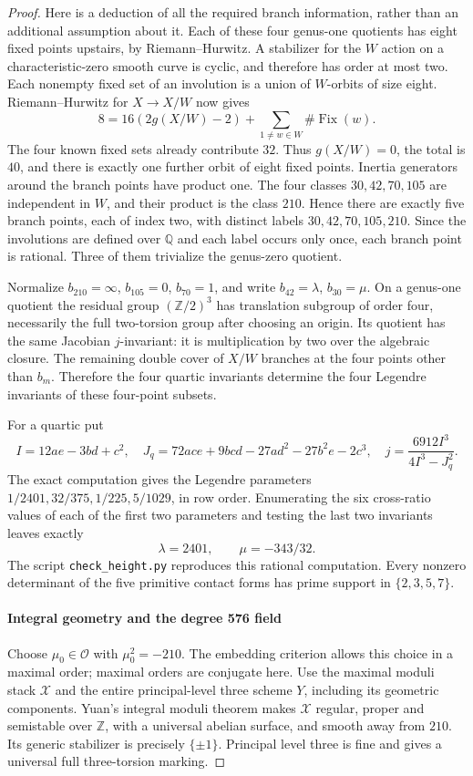 \begin{proof}
Here is a deduction of all the required branch information, rather than
an additional assumption about it. Each of these four genus-one quotients
has eight fixed points upstairs, by Riemann--Hurwitz. A stabilizer for the
$W$ action on a characteristic-zero smooth curve is cyclic, and therefore
has order at most two. Each nonempty fixed set of an involution is a union
of $W$-orbits of size eight. Riemann--Hurwitz for $X\to X/W$ now gives
\[
 8=16(2g(X/W)-2)+\sum_{1\ne w\in W}\#\operatorname{Fix}(w).
\]
The four known fixed sets already contribute $32$. Thus $g(X/W)=0$,
the total is $40$, and there is exactly one further orbit of eight fixed
points. Inertia generators around the branch points have product one.
The four classes $30,42,70,105$ are independent in $W$, and their product
is the class $210$. Hence there are exactly five branch points, each of
index two, with distinct labels $30,42,70,105,210$. Since the involutions
are defined over $\mathbb Q$ and each label occurs only once, each branch
point is rational. Three of them trivialize the genus-zero quotient.

Normalize $b_{210}=\infty$, $b_{105}=0$, $b_{70}=1$, and write
$b_{42}=\lambda$, $b_{30}=\mu$. On a genus-one quotient the residual
group $(\mathbb Z/2)^3$ has translation subgroup of order four, necessarily
the full two-torsion group after choosing an origin. Its quotient has the
same Jacobian $j$-invariant: it is multiplication by two over the algebraic
closure. The remaining double cover of $X/W$ branches at the four points
other than $b_m$. Therefore the four quartic invariants determine the four
Legendre invariants of these four-point subsets.

For a quartic put
\[
 I=12ae-3bd+c^2,\quad
 J_q=72ace+9bcd-27ad^2-27b^2e-2c^3,\quad
 j=\frac{6912I^3}{4I^3-J_q^2}.
\]
The exact computation gives the Legendre parameters
$1/2401,32/375,1/225,5/1029$, in row order. Enumerating the six cross-ratio
values of each of the first two parameters and testing the last two
invariants leaves exactly
\[
 \lambda=2401,\qquad\mu=-343/32.
\]
The script \texttt{check\_height.py} reproduces this rational computation.
Every nonzero determinant of the five primitive contact forms has prime
support in $\{2,3,5,7\}$.

\paragraph{Integral geometry and the degree 576 field}
Choose $\mu_0\in\mathcal O$ with $\mu_0^2=-210$. The embedding criterion
allows this choice in a maximal order; maximal orders are conjugate here.
Use the maximal moduli stack $\mathscr X$ and the entire principal-level
three scheme $Y$, including its geometric components. Yuan's integral
moduli theorem \cite[Theorem 1.1 and Sections 2.1--2.2]{Yuan2024} makes $\mathscr X$ regular, proper and semistable over
$\mathbb Z$, with a universal abelian surface, and smooth away from $210$.
Its generic stabilizer is precisely $\{\pm1\}$. Principal level three is
fine and gives a universal full three-torsion marking.


\end{proof}
